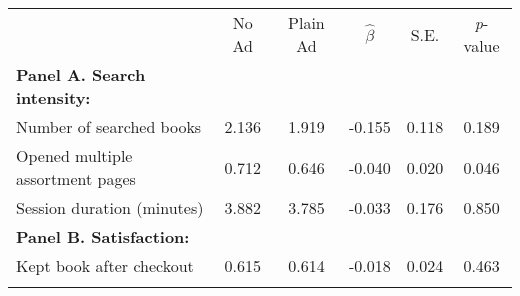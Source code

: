 \begin{center}
\begin{tabular}{lccccc}
\hline \noalign{\smallskip} & No Ad & Plain Ad & $\hat{\beta}$ & S.E. & \emph{p}-value\\
\noalign{\smallskip}\hline \noalign{\smallskip}\textbf{Panel A. Search intensity:} &  &  &  &  & \\
Number of searched books & 2.136 & 1.919 & -0.155 & 0.118 & 0.189\\
Opened multiple assortment pages & 0.712 & 0.646 & -0.040 & 0.020 & 0.046\\
Session duration (minutes) & 3.882 & 3.785 & -0.033 & 0.176 & 0.850\\
\textbf{Panel B. Satisfaction:} &  &  &  &  & \\
Kept book after checkout & 0.615 & 0.614 & -0.018 & 0.024 & 0.463\\
\noalign{\smallskip}\hline\end{tabular}\\
\end{center}
